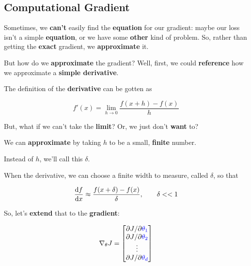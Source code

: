     \subsection{Computational Gradient}
    
        Sometimes, we \textbf{can't} easily find the \textbf{equation} for our gradient: maybe our loss isn't a simple \textbf{equation}, or we have some \textbf{other} kind of problem. So, rather than getting the \textbf{exact} gradient, we \textbf{approximate} it.
        
        But how do we \textbf{approximate} the gradient? Well, first, we could \textbf{reference} how we approximate a \textbf{simple derivative}.
            
        The definition of the \textbf{derivative} can be gotten as 
        
        \begin{equation}
            f'(x) = \lim_{h \rightarrow 0} \frac{f(x+h)-f(x)}{h}
        \end{equation}
        
        But, what if we can't take the \textbf{limit}? Or, we just don't \textbf{want} to? 
        
        We can \textbf{approximate} by taking $h$ to be a small, \textbf{finite} number.
        
        Instead of $h$, we'll call this $\delta$.\\
        
        \begin{concept}
            When  the derivative, we can choose a  finite width to measure, called $\delta$, so that
            
            \begin{equation*}
                \frac{\dd f}{\dd x} \approx
                \frac{f(x+\delta)-f(x)}{\delta} , \qquad \delta << 1
            \end{equation*}
        \end{concept}
        
        So, let's \textbf{extend} that to the \textbf{gradient}:
        
        \begin{equation}
            \nabla_\theta J 
            = 
            \begin{bmatrix}
                  {\partial J}/{\partial  \textcolor{blue}{\theta_1} } \\ 
                  {\partial J}/{\partial  \textcolor{blue}{\theta_2} } \\
                  \vdots \\
                  {\partial J}/{\partial  \textcolor{blue}{\theta_d} } \\
            \end{bmatrix}
        \end{equation}
        
